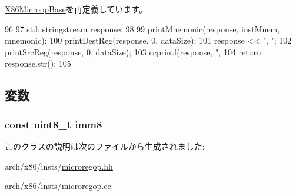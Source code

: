 \hyperlink{classX86ISA_1_1X86MicroopBase_a95d323a22a5f07e14d6b4c9385a91896}{X86MicroopBase}を再定義しています。


\begin{DoxyCode}
96     {
97         std::stringstream response;
98 
99         printMnemonic(response, instMnem, mnemonic);
100         printDestReg(response, 0, dataSize);
101         response << ", ";
102         printSrcReg(response, 0, dataSize);
103         ccprintf(response, ", %
104         return response.str();
105     }
\end{DoxyCode}


\subsection{変数}
\hypertarget{classX86ISA_1_1RegOpImm_a7dfee5e1276e6f73a91d19ef3d59f5d4}{
\subsubsection[{imm8}]{\setlength{\rightskip}{0pt plus 5cm}const uint8\_\-t {\bf imm8}}}
\label{classX86ISA_1_1RegOpImm_a7dfee5e1276e6f73a91d19ef3d59f5d4}


このクラスの説明は次のファイルから生成されました:\begin{DoxyCompactItemize}
\item 
arch/x86/insts/\hyperlink{microregop_8hh}{microregop.hh}\item 
arch/x86/insts/\hyperlink{microregop_8cc}{microregop.cc}\end{DoxyCompactItemize}

